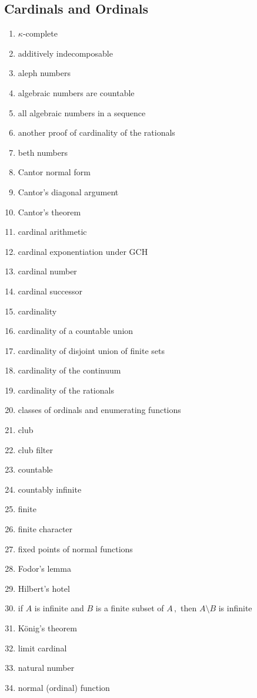 \documentclass[12pt]{article}
\begin{document}
\begin{multicols}{2}
\section{Cardinals and Ordinals}
\begin{enumerate}
\item $\kappa$-complete
\item additively indecomposable
\item aleph numbers
\item algebraic numbers are countable
\item all algebraic numbers in a sequence 
\item another proof of cardinality of the rationals
\item beth numbers
\item Cantor normal form
\item Cantor's diagonal argument
\item Cantor's theorem
\item cardinal arithmetic
\item cardinal exponentiation under GCH 
\item cardinal number
\item cardinal successor
\item cardinality
\item cardinality of a countable union
\item cardinality of disjoint union of finite sets 
\item cardinality of the continuum 
\item cardinality of the rationals
\item classes of ordinals and enumerating functions
\item club
\item club filter
\item countable
\item countably infinite
\item finite
\item finite character
\item fixed points of normal functions
\item Fodor's lemma
\item Hilbert's hotel
\item if $A$ is infinite and $B$ is a finite subset of $A\,\!,$ then $A\setminus B$ is infinite
\item K\"onig's theorem
\item limit cardinal 
\item natural number
\item normal (ordinal) function

\end{enumerate}
\end{multicols}
\end{document}
